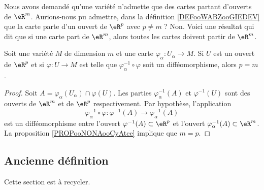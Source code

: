 Nous avons demandé qu'une variété n'admette que des cartes partant d'ouverts de \( \eR^m\). Aurions-nous pu admettre, dans la définition \ref{DEFooWABZooGIEDEV} que la carte parte d'un ouvert de \( \eR^p\) avec \( p\neq m\) ? Non. Voici une résultat qui dit que si une carte part de \( \eR^m\), alors toutes les cartes doivent partir de \( \eR^m\).

\begin{proposition}
	Soit une variété \( M\) de dimension \( m\) et une carte \( \varphi_{\alpha}\colon U_{\alpha}\to M\). Si \( U\) est un ouvert de \( \eR^p\) et si \( \varphi\colon U\to M\) est telle que \( \varphi_{\alpha}^{-1}\circ \varphi\) soit un difféomorphisme, alors \( p=m\).
\end{proposition}

\begin{proof}
	Soit \( A=\varphi_{\alpha}(U_{\alpha})\cap \varphi(U)\). Les parties \( \varphi_{\alpha}^{-1}(A)\) et \( \varphi^{-1}(U)\) sont des ouverts de \( \eR^m\) et de \( \eR^p\) respectivement. Par hypothèse, l'application
	\begin{equation}
		\varphi_{\alpha}^{-1}\circ\varphi\colon \varphi^{-1}(A)\to \varphi_{\alpha}^{-1}(A)
	\end{equation}
	est un difféomorphisme entre l'ouvert \( \varphi^{-1}(A)\subset \eR^p\) et l'ouvert \( \varphi_{\alpha}^{-1}(A)\subset \eR^m\). La proposition \ref{PROPooNONAooCyAtce} implique que \( m=p\).
\end{proof}

\subsection{Ancienne définition}

Cette section est à recycler.

